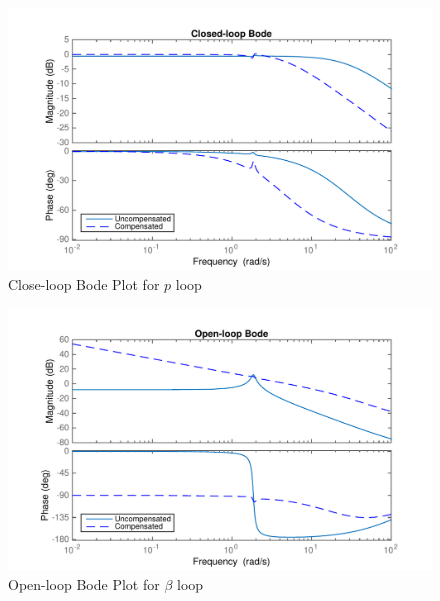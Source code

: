 \documentclass[11pt]{article}
\begin{document}
\begin{figure}[h!]
\begin{center}
\includegraphics[height=.4\textheight]{figures/closeloop_p}
\caption{Close-loop Bode Plot for $p$ loop}
\end{center}
\end{figure}

\begin{figure}[h!]
\begin{center}
\includegraphics[height=.4\textheight]{figures/openloop_beta}
\caption{Open-loop Bode Plot for $\beta$ loop}
\end{center}
\end{figure}
\end{document}
